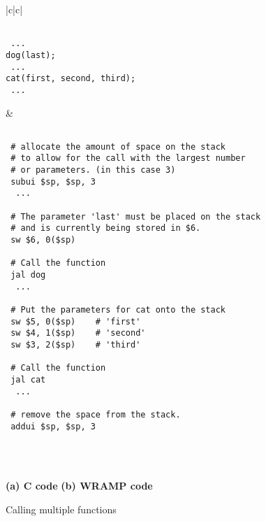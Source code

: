 %
%
\begin{figure}[!hbtp]
\begin{footnotesize}
\begin{center}
\begin{tabular}{|c|c|}
\hline
\begin{minipage}[t]{5cm}
\vspace{\topsep}
\begin{verbatim}

 ...
dog(last);
 ...
cat(first, second, third);
 ...

\end{verbatim}
\end{minipage}
&
\begin{minipage}[t]{8cm}
\vspace{\topsep}
\begin{verbatim}

 # allocate the amount of space on the stack
 # to allow for the call with the largest number
 # or parameters. (in this case 3)
 subui $sp, $sp, 3
  ...

 # The parameter 'last' must be placed on the stack
 # and is currently being stored in $6.
 sw $6, 0($sp)

 # Call the function
 jal dog
  ...

 # Put the parameters for cat onto the stack
 sw $5, 0($sp)    # 'first'
 sw $4, 1($sp)    # 'second'
 sw $3, 2($sp)    # 'third'

 # Call the function
 jal cat
  ...

 # remove the space from the stack.
 addui $sp, $sp, 3

\end{verbatim}
\end{minipage}
\\
\hline
\end{tabular}
\\
\textbf{(a) C code}
\hspace{3.5cm}
\textbf{(b) WRAMP code}
\end{center}
\end{footnotesize}

\caption{Calling multiple functions}
\label{fig:paramcalling}
\end{figure}

